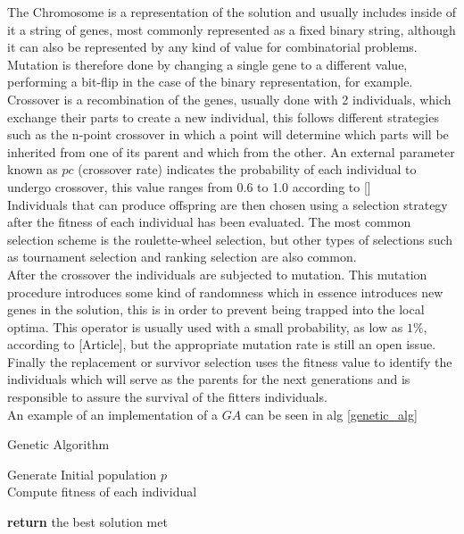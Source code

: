 The Chromosome is a representation of the solution and usually includes inside of it a string of genes, most commonly represented as a fixed binary string, although it can also be represented by any kind of value for combinatorial problems. Mutation is therefore done by changing a single gene to a different value, performing a bit-flip in the case of the binary representation, for example.\\

Crossover is a recombination of the genes, usually done with 2 individuals, which exchange their parts to create a new individual, this follows different strategies such as the n-point crossover in which a point will determine which parts will be inherited from one of its parent and which from the other. An external parameter known as $pc$ (crossover rate) indicates the probability of each individual to undergo crossover, this value ranges from 0.6 to 1.0 according to []\\

Individuals that can produce offspring are then chosen using a selection strategy after the fitness of each individual has been evaluated. The most common selection scheme is the roulette-wheel selection, but other types of selections such as tournament selection and ranking selection are also common.\\

After the crossover the individuals are subjected to mutation. This mutation procedure introduces some kind of randomness which in essence introduces new genes in the solution, this is in order to prevent being trapped into the local optima. This operator is usually used with a small probability, as low as $1\%$, according to [Article], but the appropriate mutation rate is still an open issue.\\

Finally the replacement or survivor selection uses the fitness value to identify the individuals which will serve as the parents for the next generations and is responsible to assure the survival of the fitters individuals.\\

An example of an implementation of a $GA$ can be seen in alg \ref{genetic_alg}

\begin{algorithm}[H]
\label{genetic_alg}
\caption{Genetic Algorithm}
\SetAlgoLined 
Generate Initial population $p$\;\\
Compute fitness of each individual\;\

 \textbf{return} the best solution met\;
\end{algorithm}

